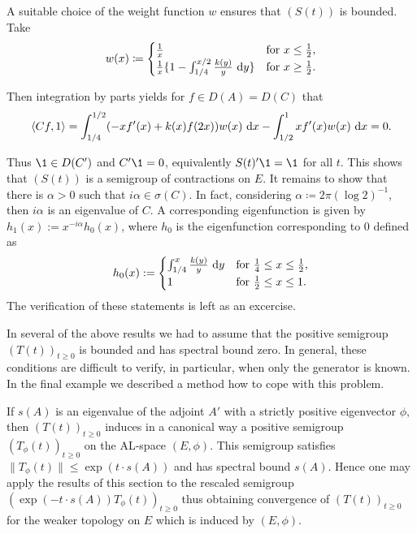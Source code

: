 \begin{example}
A suitable choice of the weight function $w$ ensures that $(S(t))$ is bounded.
Take
\begin{equation}\label{eq:c4-2.14}
w(x) \coloneqq \begin{cases}
    \frac{1}{x} & \text{for } x \leq \frac{1}{2}, \\
    \frac{1}{x}\{1 - \int_{1/4}^{x/2} \frac{k(y)}{y} \, \mathop{}\!\mathrm{d}{y} \} & \text{for } x \geq \frac{1}{2}.
\end{cases}
\end{equation}


Then integration by parts yields for $f \in D(A) = D(C)$ that
\begin{align*}
\langle Cf,1 \rangle = \int_{1/4}^{1/2} (-xf'(x) + k(x)f(2x))w(x) \, \mathop{}\!\mathrm{d}{x} - \int_{1/2}^{1} xf'(x)w(x) \, \mathop{}\!\mathrm{d}{x} = 0.
\end{align*}

Thus $\1 \in D(C')$ and $C'\1 = 0$, equivalently $S(t)'\1 = \1$ for all $t$.
This shows that $(S(t))$ is a semigroup of contractions on $E$.
It remains to show that there is $\alpha > 0$ such that $i\alpha \in \sigma(C)$.
In fact, considering $\alpha \coloneqq 2\pi(\log 2)^{-1}$,  then $i\alpha$ is an eigenvalue of $C$.
A corresponding eigenfunction is given by $h_{1}(x) := x^{-i\alpha}h_{0}(x)$, where $h_{0}$ is the eigenfunction corresponding to $0$ defined as
\begin{equation}\label{eq:c4-2.15}
h_{0}(x) := \begin{cases}
    \int_{1/4}^{x} \frac{k(y)}{y} \, \mathop{}\!\mathrm{d}{y} & \text{for } \frac{1}{4} \leq x \leq \frac{1}{2}, \\
    1 & \text{for } \frac{1}{2} \leq x \leq 1.
\end{cases}
\end{equation}
The verification of these statements is left as an excercise.
\end{example}

In several of the above results we had to assume that the positive semigroup $(T(t))_{t\geq 0}$ is bounded and has spectral bound zero.
In general, these conditions are difficult to verify, in particular, when only the generator is known.
In the final example we described a method how to cope with this problem. 

If $s(A)$ is an eigenvalue of the adjoint $A'$ with a strictly positive eigenvector $\phi$, then $(T(t))_{t\geq 0}$ induces in a canonical way a positive semigroup $(T_{\phi}(t))_{t \geq 0}$ on the AL-space $(E,\phi)$.
This semigroup satisfies $\|T_{\phi}(t)\| \leq \exp(t \cdot s(A))$ and has spectral bound $s(A)$.
Hence one may apply the results of this section to the rescaled semigroup $(\exp(-t \cdot s(A))T_{\phi}(t))_{t \geq 0}$ thus obtaining convergence of $(T(t))_{t \geq 0}$ for the weaker topology on $E$ which is induced by $(E,\phi)$.

